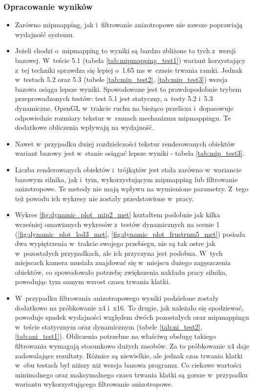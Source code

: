 \documentclass[a4paper,twoside,12pt]{book}
\begin{document}
\subsubsection{Opracowanie wyników}
\begin{itemize}
    \item Zarówno mipmapping, jak i~filtrowanie anizotropowe nie zawsze poprawiają wydajność systemu.
    \item Jeżeli chodzi o~mipmapping to wyniki są bardzo zbliżone to tych z~wersji bazowej. W~teście 5.1 (tabela \ref{tab:mipmapping_test1}) wariant korzystający z~tej techniki sprawdza się lepiej o~1.65 ms w~czasie trwania ramki. Jednak w~testach 5.2 oraz 5.3 (tabele \ref{tab:mip_test2}, \ref{tab:mip_test3}) wersja bazowa osiąga lepsze wyniki. Spowodowane jest to prawdopodobnie trybem przeprowadzonych testów: test 5.1 jest statyczny, a~testy 5.2 i~5.3 dynamiczne. OpenGL w~trakcie ruchu na bieżąco przelicza i~dopasowuje odpowiednie rozmiary tekstur w~ramach mechanizmu mipmappingu. Te dodatkowe obliczenia wpływają na wydajność.
    \item Nawet w~przypadku dużej rozdzielczości tekstur renderowanych obiektów wariant bazowy jest w~stanie osiągać lepsze wyniki - tabela \ref{tab:mip_test3}.
    \item Liczba renderowanych obiektów i~trójkątów jest stała zarówno w~wariancie bazowym silnika, jak i~tym, wykorzystującym mipmapping lub filtrowanie anizotropowe. Te metody nie mają wpływu na wymienione parametry. Z~tego też powodu ich wykresy nie zostały przedstawione w~pracy.
    \item Wykres \ref{fig:dynamic_plot_mip2_met} kształtem podobnie jak kilka wcześniej omawianych wykresów z~testów dynamicznych na scenie 1 (\ref{fig:dynamic_plot_lod3_met}, \ref{fig:dynamic_plot_frustrum5_met}) posiada dwa wypiętrzenia w~trakcie swojego przebiegu, nie są tak ostre jak w~pozostałych przypadkach, ale ich przyczyna jest podobna. W~tych miejscach kamera musiała znajdować się w~miejscu dużego zagęszczenia obiektów, co spowodowało potrzebę zwiększenia nakładu pracy silnika, powodując tym samym wzrost czasu trwania klatki.
    \item W~przypadku filtrowania anizotropowego wyniki podzielone zostały dodatkowo na próbkowanie x4 i~x16. To drugie, jak należało się spodziewać, powoduje spadek wydajności względem dwóch pozostałych oraz mipmappingu w~teście statycznym oraz dynamicznym (tabele \ref{tab:ni_test2}, \ref{tab:ani_test1}). Obliczenia potrzebne na właściwą obsługę takiego filtrowania wymagają stosunkowo dużych zasobów. Za to próbkowanie x4 daje zadowalające rezultaty. Różnice są niewielkie, ale jednak czas trwania klatki w~obu testach był niższy niż wersja bazowa programu. Co ciekawe wartości minimalnego oraz maksymalnego czasu trwania klatki są gorsze w~przypadku wariantu wykorzystującego filtrowanie anizotropowe.

\end{itemize}
\end{document}
